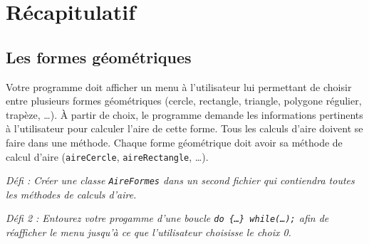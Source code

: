\documentclass[12pt]{article}
\begin{document}
\section{Récapitulatif}

\subsection{Les formes géométriques}

Votre programme doit afficher un menu à l'utilisateur lui permettant de choisir entre plusieurs formes géométriques (cercle, rectangle, triangle, polygone régulier, trapèze, \dots). À partir de choix, le programme demande les informations pertinents à l'utilisateur pour calculer l'aire de cette forme. Tous les calculs d'aire doivent se faire dans une méthode. Chaque forme géométrique doit avoir sa méthode de calcul d'aire (\texttt{aireCercle}, \texttt{aireRectangle}, \dots). 

\textit{Défi : Créer une classe \texttt{AireFormes} dans un second fichier qui contiendra toutes les méthodes de calculs d'aire.}

\textit{Défi 2 : Entourez votre progamme d'une boucle \texttt{do \{\dots \} while(\dots);} afin de réafficher le menu jusqu'à ce que l'utilisateur choisisse le choix 0.}
\end{document}
